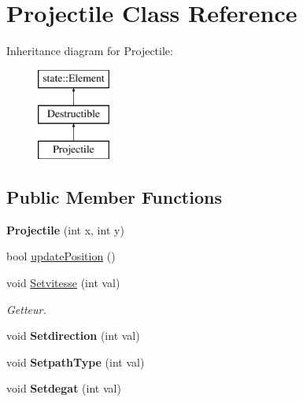 \hypertarget{class_projectile}{}\section{Projectile Class Reference}
\label{class_projectile}
Inheritance diagram for Projectile\+:\begin{figure}[H]
\begin{center}
\leavevmode
\includegraphics[height=3.000000cm]{class_projectile}
\end{center}
\end{figure}
\subsection*{Public Member Functions}
\begin{DoxyCompactItemize}
\item 
\mbox{\label{class_projectile_a7c76e234b9424374db802d83901cc9c0}} 
{\bfseries Projectile} (int x, int y)
\item 
bool \hyperlink{class_projectile_ab667833975b19a5b1a5ab6c3722da3dd}{update\+Position} ()
\item 
\mbox{\label{class_projectile_a7a4c33abdde47e2cefaeb64f9b7a5492}} 
void \hyperlink{class_projectile_a7a4c33abdde47e2cefaeb64f9b7a5492}{Setvitesse} (int val)
\begin{DoxyCompactList}\small\item\em Getteur. \end{DoxyCompactList}\item 
\mbox{\label{class_projectile_a31c436c8b15f0f5c183db1f97835fea1}} 
void {\bfseries Setdirection} (int val)
\item 
\mbox{\label{class_projectile_a97eef85a7cb2e20ec2e65a3321cfeac0}} 
void {\bfseries Setpath\+Type} (int val)
\item 
\mbox{\label{class_projectile_ab7695bd05ed63e7ceeb96e6aed3d6a28}} 
void {\bfseries Setdegat} (int val)
\end{DoxyCompactItemize}

